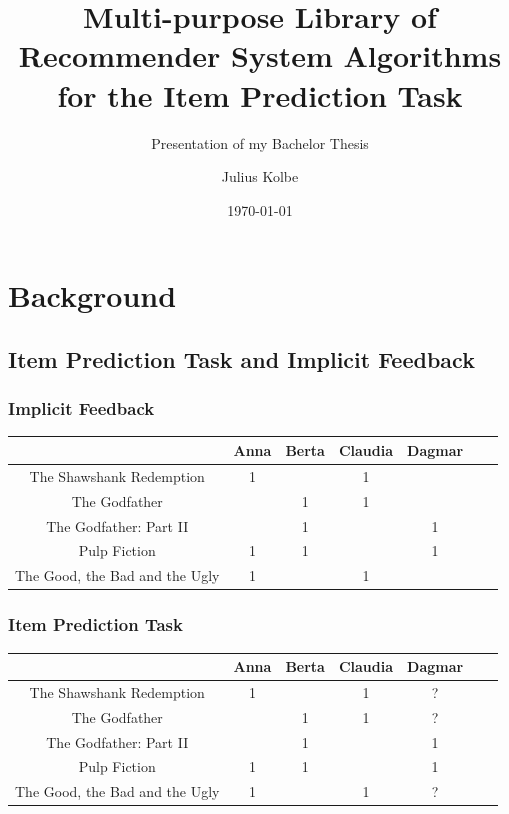 \documentclass[mathserif]{beamer}
\title[Library of Recommender System Algorithms]
{Multi-purpose Library of Recommender System Algorithms for the Item Prediction Task}
\subtitle{Presentation of my Bachelor Thesis}
\author{Julius Kolbe}
\date{\today}
\institute{\large{L3S Research Center / Leibniz University of Hanover\\ Hannover, Germany}}
\begin{document}
\frame{\titlepage} %

\section{Background}
\subsection{Item Prediction Task and Implicit Feedback}
\begin{frame}
\frametitle{Implicit Feedback}

\begin{table}[t]
\begin{tabular}{c|cccccc}
    &Anna&Berta&Claudia&Dagmar\\\hline
    The Shawshank Redemption&1&&1&\\
    The Godfather&&1&1&\\
    The Godfather: Part II&&1&&1\\
    Pulp Fiction&1&1&&1\\
    The Good, the Bad and the Ugly&1&&1&\\
\end{tabular}
\end{table}
\end{frame}
\begin{frame}
\frametitle{Item Prediction Task}

\begin{table}[t]
\begin{tabular}{c|cccccc}
    &Anna&Berta&Claudia&Dagmar\\\hline
    The Shawshank Redemption&1&&1&?\\
    The Godfather&&1&1&?\\
    The Godfather: Part II&&1&&1\\
    Pulp Fiction&1&1&&1\\
    The Good, the Bad and the Ugly&1&&1&?\\
\end{tabular}
\end{table}

\end{frame}
\end{document}
